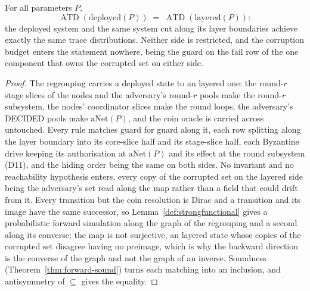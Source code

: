 \begin{theorem}
  \label{thm:aba-layered-atd}
  \leanok
  For all parameters $P$,
  \[
    \operatorname{ATD}(\mathrm{deployed}(P)) \;=\;
    \operatorname{ATD}(\mathrm{layered}(P)) :
  \]
  the deployed system and the same system cut along its layer boundaries achieve exactly the same trace distributions.
  Neither side is restricted, and the corruption budget enters the statement nowhere, being the guard on the $\mathrm{fail}$ row of the one component that owns the corrupted set on either side.
\end{theorem}

\begin{proof}\leanok
  The regrouping  carries a deployed state to an layered one: the round-$r$ stage slices of the nodes and the adversary's round-$r$ pools make the round-$r$ subsystem, the nodes' coordinator slices make the round loops, the adversary's DECIDED pools make $\mathrm{aNet}(P)$, and the coin oracle is carried across untouched.
  Every rule matches guard for guard along it, each row splitting along the layer boundary into its core-slice half and its stage-slice half, each Byzantine drive keeping its authorisation at $\mathrm{aNet}(P)$ and its effect at the round subsystem (D11), and the hiding order being the same on both sides.
  No invariant and no reachability hypothesis enters, every copy of the corrupted set on the layered side being the adversary's set read along the map rather than a field that could drift from it.
  Every transition but the coin resolution is Dirac and a transition and its image have the same successor, so Lemma~\ref{def:strongfunctional} gives a probabilistic forward simulation along the graph of the regrouping and a second along its converse; the map is not surjective, an layered state whose copies of the corrupted set disagree having no preimage, which is why the backward direction is the converse of the graph and not the graph of an inverse.
  Soundness (Theorem~\ref{thm:forward-sound}) turns each matching into an inclusion, and antisymmetry of $\subseteq$ gives the equality.
\end{proof}
